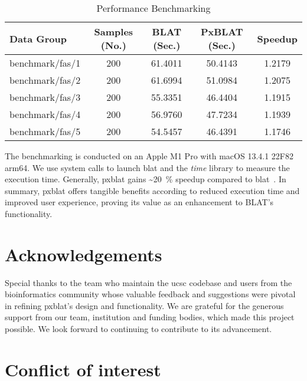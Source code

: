 \begin{table*}
	\centering
	\caption{Performance  Benchmarking}
	\label{tab:performance-evaluation}
	\begin{tabular}{lSSSS}
		\toprule
		Data Group      & {Samples (No.)} & {BLAT (Sec.)} & {PxBLAT (Sec.)} & {Speedup} \\
		\midrule
		benchmark/fas/1 & 200             & 61.4011       & 50.4143         & 1.2179    \\
		benchmark/fas/2 & 200             & 61.6994       & 51.0984         & 1.2075    \\
		benchmark/fas/3 & 200             & 55.3351       & 46.4404         & 1.1915    \\
		benchmark/fas/4 & 200             & 56.9760       & 47.7234         & 1.1939    \\
		benchmark/fas/5 & 200             & 54.5457       & 46.4391         & 1.1746    \\
		\bottomrule
	\end{tabular}
\end{table*}

The benchmarking is conducted on an Apple M1 Pro with macOS 13.4.1 22F82 arm64.
We use system calls to launch \gls{blat} and the \emph{time} library to measure the execution time.
Generally, \gls{pxblat} gains \textasciitilde\SI[per-mode=symbol,round-precision=0]{20}{\percent} speedup compared to \gls{blat}~.
In summary, \gls{pxblat}  offers tangible benefits according to reduced execution time and improved user experience, proving its value as an enhancement to BLAT's functionality.


\section*{Acknowledgements}\label{sec:acknowledgements}

Special thanks to the team who maintain the \gls{ucsc} codebase and users from the bioinformatics community whose valuable feedback and suggestions were pivotal in refining \gls{pxblat}'s design and functionality.
We are grateful for the generous support from our team, institution and funding bodies, which made this project possible.
We look forward to continuing to contribute to its advancement.

\section*{Conflict of interest}\label{sec:conflict-of-interest}

